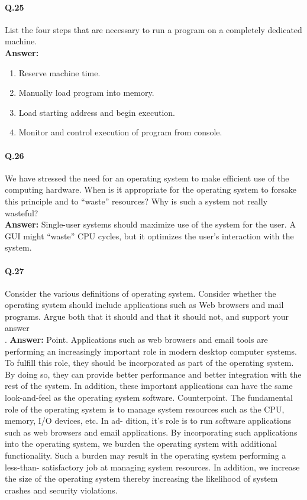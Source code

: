 \documentclass[a4paper,10pt]{article}
\begin{document}
\paragraph{Q.25}
List the four steps that are necessary to run a program on a completely
dedicated machine.\\
\textbf{Answer:}
\begin{enumerate}
\item  Reserve machine time.
\item Manually load program into memory.
\item Load starting address and begin execution.
\item Monitor and control execution of program from console.
 
\end{enumerate}

\paragraph{Q.26}
We have stressed the need for an operating system to make efficient use
of the computing hardware. When is it appropriate for the operating
system to forsake this principle and to “waste” resources? Why is such
a system not really wasteful? \\
\textbf{Answer:} Single-user systems should maximize use of the system for
the user. A GUI might “waste” CPU cycles, but it optimizes the user’s
interaction with the system.

\paragraph{Q.27}
Consider the various definitions of operating system. Consider whether
the operating system should include applications such as Web browsers
and mail programs. Argue both that it should and that it should not, and
support your answer\\.
\textbf{Answer:} Point. Applications such as web browsers and email tools are
performing an increasingly important role in modern desktop computer
systems. To fulfill this role, they should be incorporated as part of the
operating system. By doing so, they can provide better performance
and better integration with the rest of the system. In addition, these
important applications can have the same look-and-feel as the operating
system software. Counterpoint. The fundamental role of the operating system is
to manage system resources such as the CPU, memory, I/O devices, etc. In ad-
dition, it’s role is to run software applications such as web browsers and
email applications. By incorporating such applications into the operating
system, we burden the operating system with additional functionality.
Such a burden may result in the operating system performing a less-than-
satisfactory job at managing system resources. In addition, we increase
the size of the operating system thereby increasing the likelihood of
system crashes and security violations.
\end{document}
